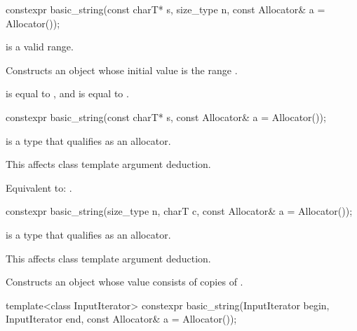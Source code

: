 %
\begin{itemdecl}
constexpr basic_string(const charT* s, size_type n, const Allocator& a = Allocator());
\end{itemdecl}

\begin{itemdescr}
\pnum
\expects
{} is a valid range.

\pnum
\effects
Constructs an object whose initial value is the range .

\pnum
\ensures
{} is equal to , and
 is equal to .
\end{itemdescr}

%
\begin{itemdecl}
constexpr basic_string(const charT* s, const Allocator& a = Allocator());
\end{itemdecl}

\begin{itemdescr}
\pnum
\constraints
{} is a type
that qualifies as an allocator.
\begin{note}
This affects class template argument deduction.
\end{note}

\pnum
\effects
Equivalent to: .
\end{itemdescr}

%
\begin{itemdecl}
constexpr basic_string(size_type n, charT c, const Allocator& a = Allocator());
\end{itemdecl}

\begin{itemdescr}
\pnum
\constraints
{} is a type
that qualifies as an allocator.
\begin{note}
This affects class template argument deduction.
\end{note}

\pnum
\effects
Constructs an object whose value consists of  copies of .
\end{itemdescr}

%
\begin{itemdecl}
template<class InputIterator>
  constexpr basic_string(InputIterator begin, InputIterator end, const Allocator& a = Allocator());
\end{itemdecl}

